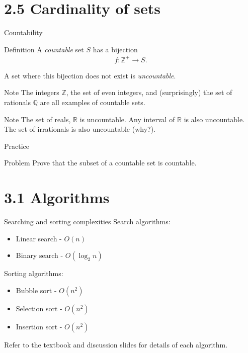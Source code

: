 \documentclass[dvipsnames,t]{beamer}
\begin{document}
\section{2.5 Cardinality of sets}

\begin{frame}{Countability}
\begin{block}{Definition}
	A \textit{countable} set $S$ has a bijection
	\begin{align*}
	f\colon \mathbb{Z}^+ \rightarrow S.
	\end{align*}
	
	A set where this bijection does not exist is \textit{uncountable}.
\end{block}
\begin{block}{Note}
	The integers $\mathbb{Z}$, the set of even integers, and (surprisingly) the set of rationals $\mathbb{Q}$ are all examples of countable sets.
\end{block}
\begin{block}{Note}
	The set of reals, $\mathbb{R}$ is uncountable. Any interval of $\mathbb{R}$ is also uncountable. The set of irrationals is also uncountable (why?).
\end{block}
\end{frame}


\begin{frame}{Practice}
\begin{block}{Problem}
	Prove that the subset of a countable set is countable.
\end{block}
\end{frame}

\section{3.1 Algorithms}

\begin{frame}{Searching and sorting complexities}
Search algorithms:
\begin{itemize}
\item Linear search - $O(n)$
\item Binary search - $O(\log_2{n})$
\end{itemize}
Sorting algorithms:
\begin{itemize}
\item Bubble sort - $O(n^2)$
\item Selection sort - $O(n^2)$
\item Insertion sort - $O(n^2)$
\end{itemize}

Refer to the textbook and discussion slides for details of each algorithm.
\end{frame}
\end{document}
